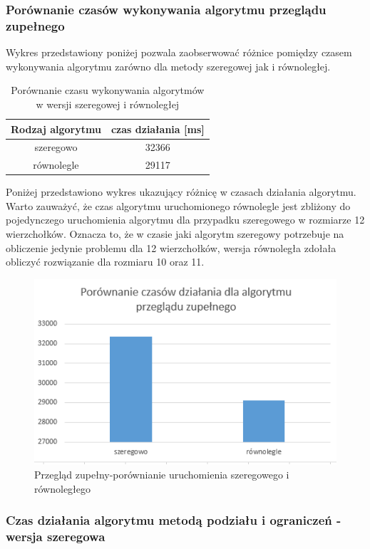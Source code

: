 \documentclass{article}
\begin{document}
			
		\subsubsection{Porównanie czasów wykonywania algorytmu przeglądu zupełnego} 
		Wykres przedstawiony poniżej pozwala zaobserwować różnice pomiędzy czasem wykonywania algorytmu zarówno dla metody szeregowej jak i równoległej.
			\begin{table}[H]
				\centering
				\caption{Porównanie czasu wykonywania algorytmów w wersji szeregowej i równoległej}
				\begin{tabular}{|c|c|}
					\hline Rodzaj algorytmu & czas działania [ms] \\ 
					\hline szeregowo & 32366 \\ 
					\hline równolegle& 29117 \\ 
							
					\hline 
				\end{tabular} 
			\end{table}	
			
		Poniżej przedstawiono wykres ukazujący różnicę w czasach działania algorytmu. Warto zauważyć, że czas algorytmu uruchomionego równolegle jest zbliżony do pojedynczego uruchomienia algorytmu dla przypadku szeregowego w rozmiarze 12 wierzchołków. Oznacza to, że w czasie jaki algorytm szeregowy potrzebuje na obliczenie jedynie problemu dla 12 wierzchołków, wersja równoległa zdołała obliczyć rozwiązanie dla rozmiaru 10 oraz 11. 
		\begin{figure}
			\centering
			\includegraphics[width=0.7\linewidth]{bfSvsR.png}
			\caption{Przegląd zupełny-porównianie uruchomienia szeregowego i równoległego}
		\end{figure}
		
	\subsubsection{Czas działania algorytmu metodą podziału i ograniczeń  - wersja szeregowa}
		
\end{document}
